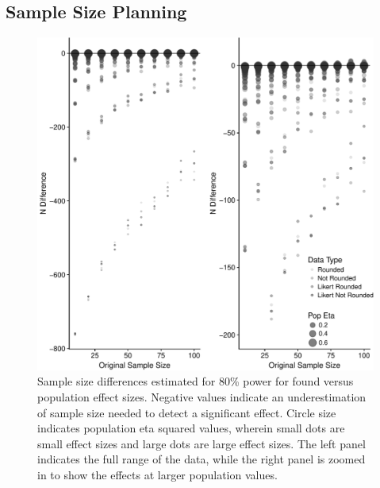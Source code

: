 \documentclass[english,man]{apa6}
\theoremstyle{definition}
\theoremstyle{definition}
\theoremstyle{definition}
\theoremstyle{remark}
\begin{document}
\subsection{Sample Size Planning}\label{sample-size-planning}

\begin{figure}
\centering
\includegraphics{buchanan_scofield_version2_files/figure-latex/powerL-graph-1.pdf}
\caption{\label{fig:powerL-graph}Sample size differences estimated for 80\%
power for found versus population effect sizes. Negative values indicate
an underestimation of sample size needed to detect a significant effect.
Circle size indicates population eta squared values, wherein small dots
are small effect sizes and large dots are large effect sizes. The left
panel indicates the full range of the data, while the right panel is
zoomed in to show the effects at larger population values.}
\end{figure}
\end{document}
